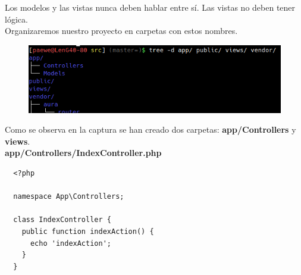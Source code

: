 \documentclass{article}
\begin{document}
Los modelos y las vistas nunca deben hablar entre sí. Las vistas no deben tener
lógica.\\

Organizaremos nuestro proyecto en carpetas con estos nombres.

\begin{figure}[h!]
  \centering
  \includegraphics[scale=0.75]{./Pictures/128_directorios_MVC.png}
\end{figure}

Como se observa en la captura se han creado dos carpetas:
\textbf{app/Controllers} y \textbf{views}.\\

\textbf{app/Controllers/IndexController.php}
\begin{verbatim}
  <?php

  namespace App\Controllers;

  class IndexController {
    public function indexAction() {
      echo 'indexAction';
    }
  }
\end{verbatim}
\end{document}
